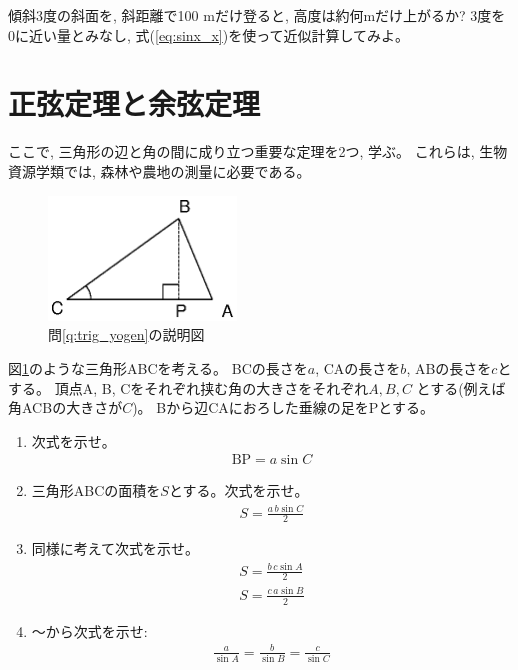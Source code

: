 \begin{q}\label{q:trig_triang_sincos2} 傾斜3度の斜面を, 斜距離で100 mだけ登ると, 高度は約何mだけ上がるか? 
3度を0に近い量とみなし, 式(\ref{eq:sinx_x})を使って近似計算してみよ。
\end{q}\mv

\section{正弦定理と余弦定理}

ここで, 三角形の辺と角の間に成り立つ重要な定理を2つ, 学ぶ。
これらは, 生物資源学類では, 森林や農地の測量に必要である。

\begin{figure}[h]
    \centering
    \includegraphics[width=5cm]{triangle_sincos.eps}
    \caption{問\ref{q:trig_yogen}の説明図}\label{fig:triangle_sincos}
\end{figure}

\begin{q}\label{q:trig_seigen} 
図\ref{fig:triangle_sincos}のような三角形ABCを考える。
BCの長さを$a$, CAの長さを$b$, ABの長さを$c$とする。
頂点A, B, Cをそれぞれ挟む角の大きさをそれぞれ$A, B, C$
とする(例えば角ACBの大きさが$C$)。
Bから辺CAにおろした垂線の足をPとする。
\begin{enumerate}
\item 次式を示せ。
\begin{eqnarray}
\text{BP}=a\sin C
\end{eqnarray}
\item 三角形ABCの面積を$S$とする。次式を示せ。
\begin{eqnarray}
S=\frac{a\,b\sin{C}}{2}\label{eq:triangle_area1}
\end{eqnarray}
\item 同様に考えて次式を示せ。
\begin{eqnarray}
S=\frac{b\,c\sin{A}}{2}\label{eq:triangle_area22}\\
S=\frac{c\,a\sin{B}}{2}\label{eq:triangle_area23}
\end{eqnarray}
\item {}〜から次式を示せ:
\begin{eqnarray}
\frac{a}{\sin A}=\frac{b}{\sin B}=\frac{c}{\sin C}\label{eq:trig_seigen}
\end{eqnarray}
\end{enumerate}
\end{q}

